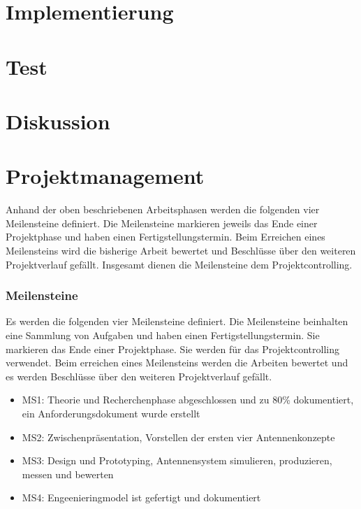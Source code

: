 \newpage
\section{Implementierung}
\section{Test}
\section{Diskussion}
\section{Projektmanagement}
Anhand der oben beschriebenen Arbeitsphasen werden die folgenden vier Meilensteine definiert. Die Meilensteine markieren jeweils das Ende einer Projektphase und haben einen Fertigstellungstermin. Beim Erreichen eines Meilensteins wird die bisherige Arbeit bewertet und Beschlüsse über den weiteren Projektverlauf gefällt. Insgesamt dienen die Meilensteine dem Projektcontrolling.
\subsubsection{Meilensteine}
Es werden die folgenden vier Meilensteine definiert. Die Meilensteine
beinhalten   eine Sammlung von Aufgaben und haben einen
Fertigstellungstermin. Sie markieren das Ende einer Projektphase. Sie
werden für das Projektcontrolling verwendet. Beim erreichen eines Meilensteins werden die Arbeiten bewertet und es werden Beschlüsse über den weiteren Projektverlauf gefällt.
	\begin{itemize}
		\item MS1: Theorie und Recherchenphase abgeschlossen und zu 80\% dokumentiert, ein Anforderungsdokument wurde erstellt
		\item MS2: Zwischenpräsentation, Vorstellen der ersten vier Antennenkonzepte
		\item MS3: Design und Prototyping, Antennensystem simulieren, produzieren, messen und bewerten
		\item MS4: Engeenieringmodel ist gefertigt und dokumentiert
	\end{itemize}

\newpage



%
%